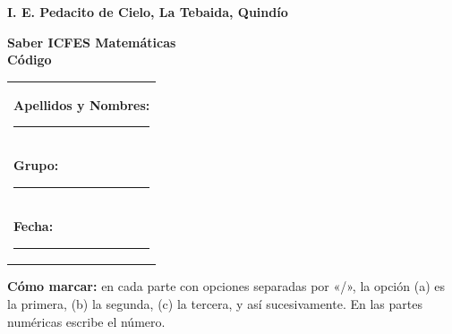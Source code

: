 \documentclass[10pt,a4paper]{article}
\makeatletter
\newcommand{\myID}{\@ID}
\newcommand{\myDate}{\@Date}
\makeatother
\begin{document}

\thispagestyle{empty}
{\sf
\textbf{\large{I. E. Pedacito de Cielo, La Tebaida, Quindío}}

\textbf{\large{Saber ICFES Matemáticas \myDate \hfill \\Código \myID}}

\vspace*{2cm}

\begin{tabular}{p{14cm}}
\textbf{Apellidos y Nombres:} \hrule \\[1.5cm]
\textbf{Grupo:} \hrule \\[1.5cm]
\textbf{Fecha:} \hrule  \\[1.5cm]
\end{tabular}

\vspace*{1cm}

\noindent\textbf{Cómo marcar:} en cada parte con opciones separadas por «/», la opción (a) es la primera, (b) la segunda, (c) la tercera, y así sucesivamente. En las partes numéricas escribe el número.

\vspace*{0.5cm}

}
\newpage

\begin{preguntas}


\end{preguntas}
\end{document}
